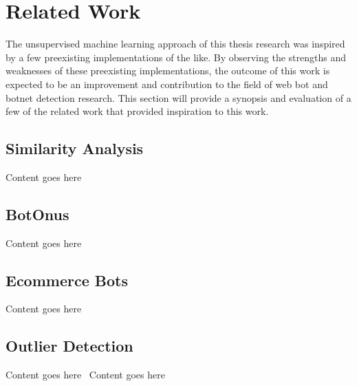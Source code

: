 
\chapter{Related Work}\label{ch:related-work}
The unsupervised machine learning approach of this thesis research was inspired by a few preexisting implementations of the like.
By observing the strengths and weaknesses of these preexisting implementations, the outcome of this work is expected to be an improvement and contribution to the field of web bot and botnet detection research.
This section will provide a synopsis and evaluation of a few of the related work that provided inspiration to this work.

\section{Similarity Analysis}\label{sec:similarity-analysis}
Content goes here~\cite{bot_detection_wei_alvarez}

\section{BotOnus}\label{sec:botonus}
Content goes here~\cite{botonus}

\section{Ecommerce Bots}\label{sec:ecommerce-bots}
Content goes here~\cite{ROVETTA2020102577}

\section{Outlier Detection}\label{sec:outlier-detection}
Content goes here~\cite{particle_swarm}
Content goes here~\cite{optimized_outlier_bot_detection}
